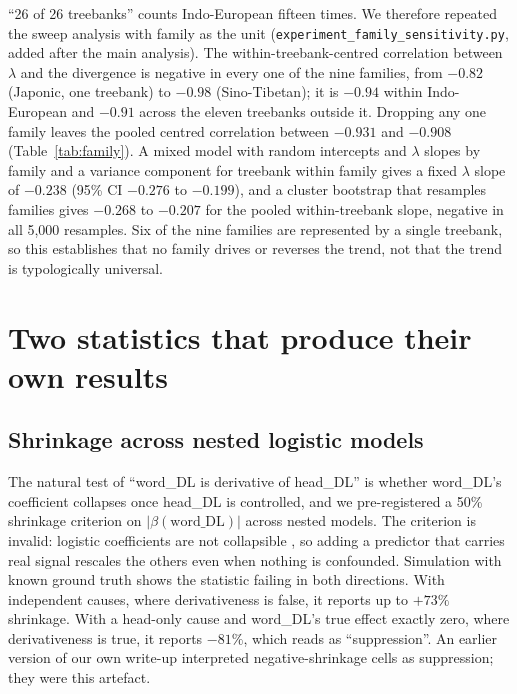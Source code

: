 \documentclass[11pt]{article}
\begin{document}
``26 of 26 treebanks'' counts Indo-European fifteen times. We therefore repeated the sweep analysis with family as the unit (\texttt{experiment\_family\_sensitivity.py}, added after the main analysis). The within-treebank-centred correlation between $\lambda$ and the divergence is negative in every one of the nine families, from $-0.82$ (Japonic, one treebank) to $-0.98$ (Sino-Tibetan); it is $-0.94$ within Indo-European and $-0.91$ across the eleven treebanks outside it. Dropping any one family leaves the pooled centred correlation between $-0.931$ and $-0.908$ (Table~\ref{tab:family}). A mixed model with random intercepts and $\lambda$ slopes by family and a variance component for treebank within family gives a fixed $\lambda$ slope of $-0.238$ (95\% CI $-0.276$ to $-0.199$), and a cluster bootstrap that resamples families gives $-0.268$ to $-0.207$ for the pooled within-treebank slope, negative in all 5,000 resamples. Six of the nine families are represented by a single treebank, so this establishes that no family drives or reverses the trend, not that the trend is typologically universal.

\begin{table}[t]
\centering\small
\caption{Robustness of the $\lambda$-sweep result by language family. $r$ and slope: within-treebank-centred correlation and slope of the divergence on $\lambda$ inside the family. Last column: pooled centred $r$ over all treebanks with that family removed (all treebanks: $-0.926$). Source: \texttt{results/family\_sensitivity.json}.}
\label{tab:family}

\end{table}

\section{Two statistics that produce their own results}

\subsection{Shrinkage across nested logistic models}
\label{sec:shrinkage}

The natural test of ``word\_DL is derivative of head\_DL'' is whether word\_DL's coefficient collapses once head\_DL is controlled, and we pre-registered a 50\% shrinkage criterion on $|\beta(\text{word\_DL})|$ across nested models. The criterion is invalid: logistic coefficients are not collapsible \citep{mood2010logistic}, so adding a predictor that carries real signal rescales the others even when nothing is confounded. Simulation with known ground truth shows the statistic failing in both directions. With independent causes, where derivativeness is false, it reports up to $+73\%$ shrinkage. With a head-only cause and word\_DL's true effect exactly zero, where derivativeness is true, it reports $-81\%$, which reads as ``suppression''. An earlier version of our own write-up interpreted negative-shrinkage cells as suppression; they were this artefact.
\end{document}
